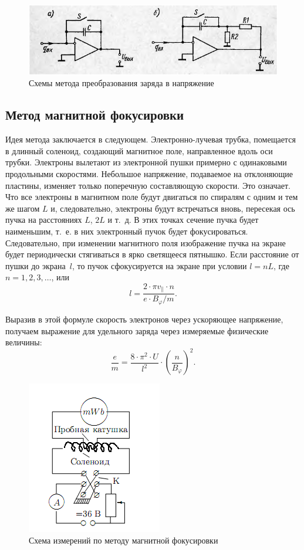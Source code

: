 \documentclass[pscyr,titlepage]{hedreport}
\begin{document}
  \begin{figure}[ht]
    \center
    \includegraphics{sl_6_1}
    \caption{Схемы метода преобразования заряда в напряжение}
    \label{picQ2U}
  \end{figure}

  \subsection{Метод магнитной фокусировки}

  Идея метода заключается в следующем. Электронно-лучевая трубка, помещается в
  длинный соленоид, создающий магнитное поле, направленное вдоль оси трубки.
  Электроны вылетают из электронной пушки примерно с одинаковыми продольными
  скоростями. Небольшое напряжение, подаваемое на отклоняющие пластины, изменяет
  только поперечную составляющую скорости. Это означает. Что все электроны в
  магнитном поле будут двигаться по спиралям с одним и тем же шагом \( L \) и,
  следовательно, электроны будут встречаться вновь, пересекая ось пучка на
  расстояниях \( L \), \( 2L \) и т.~д. В этих точках сечение пучка будет
  наименьшим, т.~е. в них электронный пучок будет фокусироваться. Следовательно,
  при изменении магнитного поля изображение пучка на экране будет периодически
  стягиваться в ярко светящееся пятнышко. Если расстояние от пушки до
  экрана~\( l \), то пучок сфокусируется на экране при условии \( l = nL \),
  где \( n = 1, 2, 3, \ldots \), или
  \[
    l = \frac{2\cdot\pi v_\|\cdot n}{e\cdot B_\varphi/m}.
  \]

  Выразив в этой формуле скорость электронов через ускоряющее напряжение,
  получаем выражение для удельного заряда через измеряемые физические величины:
  \[
    \frac{e}{m} = \frac{8\cdot\pi^2\cdot U}{l^2}\cdot
      \left( \frac{n}{B_\varphi} \right)^2.
  \]

  \begin{figure}[ht]
    \center
    \includegraphics{sl_7_1}
    \caption{Схема измерений по методу магнитной фокусировки}
    \label{picMagFoc}
  \end{figure}
\end{document}
